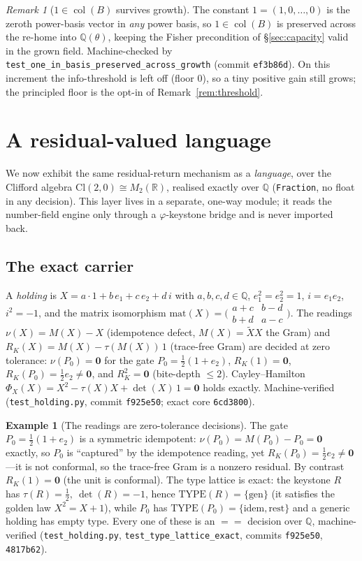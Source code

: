 \documentclass[11pt]{article}
\theoremstyle{plain}
\theoremstyle{definition}
\newtheorem{example}[theorem]{Example}
\theoremstyle{remark}
\newtheorem{remark}[theorem]{Remark}
\newcommand{\Q}{\mathbb{Q}}
\newcommand{\R}{\mathbb{R}}
\newcommand{\BB}{B}
\newcommand{\Cl}{\mathrm{Cl}}
\newcommand{\VOID}{\mathbf{0}}
\DeclareMathOperator{\col}{col}
\begin{document}
\begin{remark}[$1\in\col(\BB)$ survives growth]\label{rem:oneinB}
The constant $1=(1,0,\dots,0)$ is the zeroth power-basis vector in \emph{any} power basis, so $1\in\col(\BB)$
is preserved across the re-home into $\Q(\theta)$, keeping the Fisher precondition of
\S\ref{sec:capacity} valid in the grown field. Machine-checked by
\texttt{test\_one\_in\_basis\_preserved\_across\_growth} (commit \texttt{ef3b86d}). On this increment the
info-threshold is left off (floor $0$), so a tiny positive gain still grows; the principled floor is the
opt-in of Remark~\ref{rem:threshold}.
\end{remark}

\section{A residual-valued language}\label{sec:language}

We now exhibit the same residual-return mechanism as a \emph{language}, over the Clifford algebra
$\Cl(2,0)\cong M_2(\R)$, realised exactly over $\Q$ (\texttt{Fraction}, no float in any decision). This layer
lives in a separate, one-way module; it reads the number-field engine only through a $\varphi$-keystone
bridge and is never imported back.

\subsection{The exact carrier}
A \emph{holding} is $X=a\cdot 1+b\,e_1+c\,e_2+d\,i$ with $a,b,c,d\in\Q$, $e_1^2=e_2^2=1$, $i=e_1e_2$,
$i^2=-1$, and the matrix isomorphism $\mathrm{mat}(X)=\big(\begin{smallmatrix}a+c&b-d\\b+d&a-c\end{smallmatrix}\big)$.
The readings $\nu(X)=M(X)-X$ (idempotence defect, $M(X)=\tilde X X$ the Gram) and $R_K(X)=M(X)-\tau(M(X))\,1$
(trace-free Gram) are decided at zero tolerance: $\nu(P_0)=\VOID$ for the gate $P_0=\tfrac12(1+e_2)$,
$R_K(1)=\VOID$, $R_K(P_0)=\tfrac12 e_2\ne\VOID$, and $R_K^2=\VOID$ (bite-depth $\le2$). Cayley--Hamilton
$\Phi_X(X)=X^2-\tau(X)X+\det(X)\,1=\VOID$ holds exactly. Machine-verified
(\texttt{test\_holding.py}, commit \texttt{f925e50}; exact core \texttt{6cd3800}).

\begin{example}[The readings are zero-tolerance decisions]\label{ex:readings}
The gate $P_0=\tfrac12(1+e_2)$ is a symmetric idempotent: $\nu(P_0)=M(P_0)-P_0=\VOID$ exactly, so $P_0$ is
``captured'' by the idempotence reading, yet $R_K(P_0)=\tfrac12 e_2\ne\VOID$---it is not conformal, so the
trace-free Gram is a nonzero residual. By contrast $R_K(1)=\VOID$ (the unit is conformal). The type lattice is
exact: the keystone $R$ has $\tau(R)=\tfrac12,\ \det(R)=-1$, hence $\mathrm{TYPE}(R)=\{\text{gen}\}$ (it
satisfies the golden law $X^2=X+1$), while $P_0$ has $\mathrm{TYPE}(P_0)=\{\text{idem},\text{rest}\}$ and a
generic holding has empty type. Every one of these is an $==$ decision over $\Q$, machine-verified
(\texttt{test\_holding.py}, \texttt{test\_type\_lattice\_exact}, commits \texttt{f925e50}, \texttt{4817b62}).
\end{example}
\end{document}
